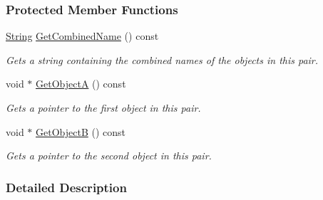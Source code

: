 \subsubsection*{Protected Member Functions}
\begin{DoxyCompactItemize}
\item 
\hypertarget{classMezzanine_1_1AreaEffectTerrainPair_ae29ff81b7ce51ea67a62d61efcc36d01}{
\hyperlink{namespaceMezzanine_acf9fcc130e6ebf08e3d8491aebcf1c86}{String} \hyperlink{classMezzanine_1_1AreaEffectTerrainPair_ae29ff81b7ce51ea67a62d61efcc36d01}{GetCombinedName} () const }
\label{classMezzanine_1_1AreaEffectTerrainPair_ae29ff81b7ce51ea67a62d61efcc36d01}

\begin{DoxyCompactList}\small\item\em Gets a string containing the combined names of the objects in this pair. \item\end{DoxyCompactList}\item 
\hypertarget{classMezzanine_1_1AreaEffectTerrainPair_a94bed7e8238b9818a9aa12f73761b17c}{
void $\ast$ \hyperlink{classMezzanine_1_1AreaEffectTerrainPair_a94bed7e8238b9818a9aa12f73761b17c}{GetObjectA} () const }
\label{classMezzanine_1_1AreaEffectTerrainPair_a94bed7e8238b9818a9aa12f73761b17c}

\begin{DoxyCompactList}\small\item\em Gets a pointer to the first object in this pair. \item\end{DoxyCompactList}\item 
\hypertarget{classMezzanine_1_1AreaEffectTerrainPair_af1e5b08b6ac9567cd9a2b795300ffb5c}{
void $\ast$ \hyperlink{classMezzanine_1_1AreaEffectTerrainPair_af1e5b08b6ac9567cd9a2b795300ffb5c}{GetObjectB} () const }
\label{classMezzanine_1_1AreaEffectTerrainPair_af1e5b08b6ac9567cd9a2b795300ffb5c}

\begin{DoxyCompactList}\small\item\em Gets a pointer to the second object in this pair. \item\end{DoxyCompactList}\end{DoxyCompactItemize}


\subsubsection{Detailed Description}


